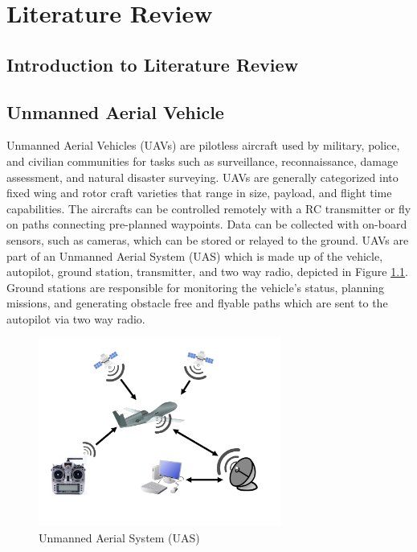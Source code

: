 \documentclass[numbered,pdftex]{ohio-etd}
\begin{document}
\chapter{Literature Review}
\section{Introduction to Literature Review}


\section{Unmanned Aerial Vehicle}

Unmanned Aerial Vehicles (UAVs) are pilotless aircraft used by military, police, and civilian communities for tasks such as surveillance, reconnaissance, damage assessment, and natural disaster surveying.  UAVs are generally categorized into fixed wing and rotor craft varieties that range in size, payload, and flight time capabilities. The aircrafts can be controlled remotely with a RC transmitter or fly on paths connecting pre-planned waypoints. Data can be collected with on-board sensors, such as cameras, which can be stored or relayed to the ground. UAVs are part of an Unmanned Aerial System (UAS) which is made up of the vehicle, autopilot, ground station, transmitter, and two way radio, depicted in Figure \ref{fig:uas}. Ground stations are responsible for monitoring the vehicle's status, planning missions, and generating obstacle free and flyable paths which are sent to the autopilot via two way radio. 

\begin{figure}
	\centering
	\includegraphics[width=8cm]{PaperFigures/UAS}
	\caption{Unmanned Aerial System (UAS)}
	\label{fig:uas}
\end{figure}
\end{document}
